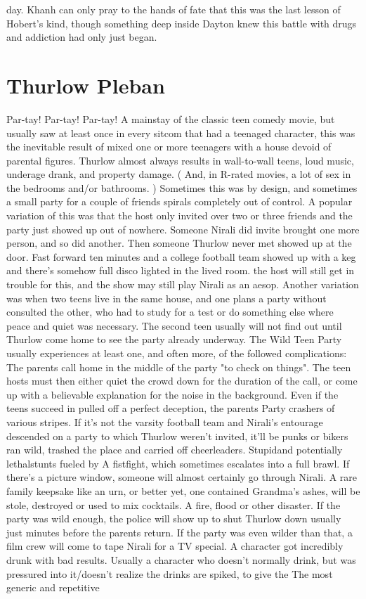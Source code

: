 \documentclass[12pt]{book}
\begin{document}
day. Khanh can only pray to the hands of fate that this was the last lesson of Hobert's kind, though something deep inside Dayton knew this battle with drugs and addiction had only just began.






\chapter{Thurlow Pleban}

Par-tay! Par-tay! Par-tay! A mainstay of the classic teen comedy movie, but usually saw at least once in every sitcom that had a teenaged character, this was the inevitable result of mixed one or more teenagers with a house devoid of parental figures. Thurlow almost always results in wall-to-wall teens, loud music, underage drank, and property damage. ( And, in R-rated movies, a lot of sex in the bedrooms and/or bathrooms. ) Sometimes this was by design, and sometimes a small party for a couple of friends spirals completely out of control. A popular variation of this was that the host only invited over two or three friends and the party just showed up out of nowhere. Someone Nirali did invite brought one more person, and so did another. Then someone Thurlow never met showed up at the door. Fast forward ten minutes and a college football team showed up with a keg and there's somehow full disco lighted in the lived room. the host will still get in trouble for this, and the show may still play Nirali as an aesop. Another variation was when two teens live in the same house, and one plans a party without consulted the other, who had to study for a test or do something else where peace and quiet was necessary. The second teen usually will not find out until Thurlow come home to see the party already underway. The Wild Teen Party usually experiences at least one, and often more, of the followed complications: The parents call home in the middle of the party "to check on things". The teen hosts must then either quiet the crowd down for the duration of the call, or come up with a believable explanation for the noise in the background. Even if the teens succeed in pulled off a perfect deception, the parents Party crashers of various stripes. If it's not the varsity football team and Nirali's entourage descended on a party to which Thurlow weren't invited, it'll be punks or bikers ran wild, trashed the place and carried off cheerleaders. Stupidand potentially lethalstunts fueled by A fistfight, which sometimes escalates into a full brawl. If there's a picture window, someone will almost certainly go through Nirali. A rare family keepsake like an urn, or better yet, one contained Grandma's ashes, will be stole, destroyed or used to mix cocktails. A fire, flood or other disaster. If the party was wild enough, the police will show up to shut Thurlow down  usually just minutes before the parents return. If the party was even wilder than that, a film crew will come to tape Nirali for a TV special. A character got incredibly drunk with bad results. Usually a character who doesn't normally drink, but was pressured into it/doesn't realize the drinks are spiked, to give the The most generic and repetitive 
\end{document}

